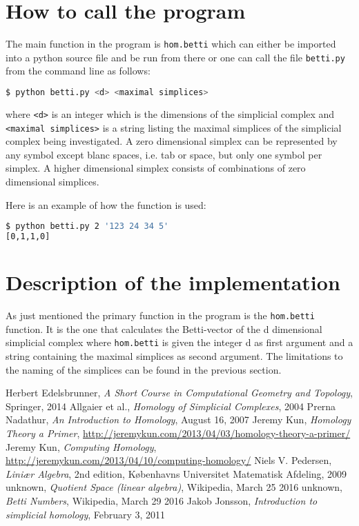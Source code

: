 \documentclass[11pt,a4paper,twoside]{report}
\begin{document}
\section{How to call the program}
The main function in the program is \texttt{hom.betti} which can either be imported into a python source file and be run from there or one can call the file \texttt{betti.py} from the command line as follows:
\begin{lstlisting}[language=bash]
$ python betti.py <d> <maximal simplices> 
\end{lstlisting}
where \texttt{<d>} is an integer which is the dimensions of the simplicial complex and \texttt{<maximal simplices>} is a string listing the maximal simplices of the simplicial complex being investigated. A zero dimensional simplex can be represented by any symbol except blanc spaces, i.e. tab or space, but only one symbol per simplex. A higher dimensional simplex consists of combinations of zero dimensional simplices.

Here is an example of how the function is used:
\begin{lstlisting}[language=bash]
$ python betti.py 2 '123 24 34 5'
[0,1,1,0] 
\end{lstlisting}

\section{Description of the implementation}
As just mentioned the primary function in the program is the \texttt{hom.betti} function. It is the one that calculates the Betti-vector of the d dimensional simplicial complex where \texttt{hom.betti} is given the integer d as first argument and a string containing the maximal simplices as second argument. The limitations to the naming of the simplices can be found in the previous section. 


\newpage

\begin{thebibliography}{9}
Herbert Edelsbrunner, \emph{A Short Course in Computational Geometry and Topology}, Springer, 2014
 Allgaier et al., \emph{Homology of Simplicial Complexes}, 2004
 Prerna Nadathur, \emph{An Introduction to Homology}, August 16, 2007
 Jeremy Kun, \emph{Homology Theory a Primer}, \url{http://jeremykun.com/2013/04/03/homology-theory-a-primer/}
 Jeremy Kun, \emph{Computing Homology}, \url{http://jeremykun.com/2013/04/10/computing-homology/}
 Niels V. Pedersen, \emph{Liniær Algebra}, 2nd edition, Københavns Universitet Matematisk Afdeling, 2009
 unknown, \emph{Quotient Space (linear algebra)}, Wikipedia, March 25 2016
 unknown, \emph{Betti Numbers}, Wikipedia, March 29 2016
 Jakob Jonsson, \emph{Introduction to simplicial homology}, February 3, 2011
\end{thebibliography}
\end{document}
